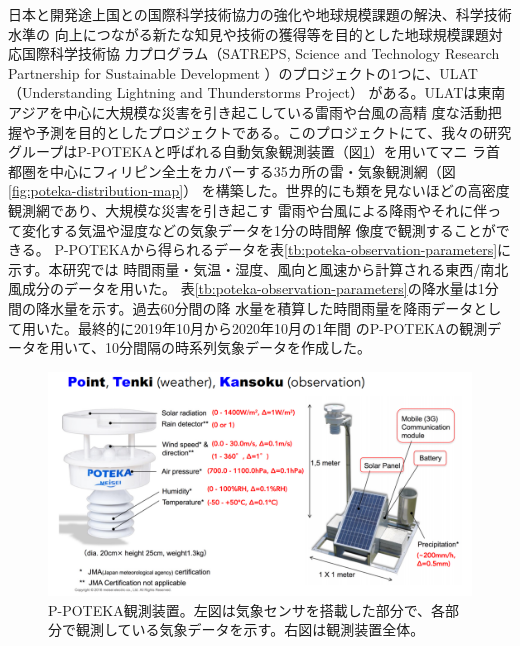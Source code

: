 日本と開発途上国との国際科学技術協力の強化や地球規模課題の解決、科学技術水準の
向上につながる新たな知見や技術の獲得等を目的とした地球規模課題対応国際科学技術協
力プログラム（SATREPS, Science and Technology Research Partnership for Sustainable
Development ）のプロジェクトの1つに、ULAT（Understanding Lightning and Thunderstorms Project）
がある。ULATは東南アジアを中心に大規模な災害を引き起こしている雷雨や台風の高精
度な活動把握や予測を目的としたプロジェクトである。このプロジェクトにて、我々の研究
グループはP-POTEKAと呼ばれる自動気象観測装置（図\ref{fig:poteka-aws}）を用いてマニ
ラ首都圏を中心にフィリピン全土をカバーする35カ所の雷・気象観測網（図\ref{fig:poteka-distribution-map}）
を構築した。世界的にも類を見ないほどの高密度観測網であり、大規模な災害を引き起こす
雷雨や台風による降雨やそれに伴って変化する気温や湿度などの気象データを1分の時間解
像度で観測することができる。
P-POTEKAから得られるデータを表\ref{tb:poteka-observation-parameters}に示す。本研究では
時間雨量・気温・湿度、風向と風速から計算される東西/南北風成分のデータを用いた。
表\ref{tb:poteka-observation-parameters}の降水量は1分間の降水量を示す。過去60分間の降
水量を積算した時間雨量を降雨データとして用いた。最終的に2019年10月から2020年10月の1年間
のP-POTEKAの観測データを用いて、10分間隔の時系列気象データを作成した。

\begin{figure}[H]
\begin{center}
\includegraphics[width=0.9\linewidth]{fig/methodologies/poteka-aws.png}
\captionsetup{width=0.9\linewidth}
\caption{P-POTEKA観測装置。左図は気象センサを搭載した部分で、各部分で観測している気象データを示す。右図は観測装置全体。}
\label{fig:poteka-aws}
\end{center}
\end{figure}

